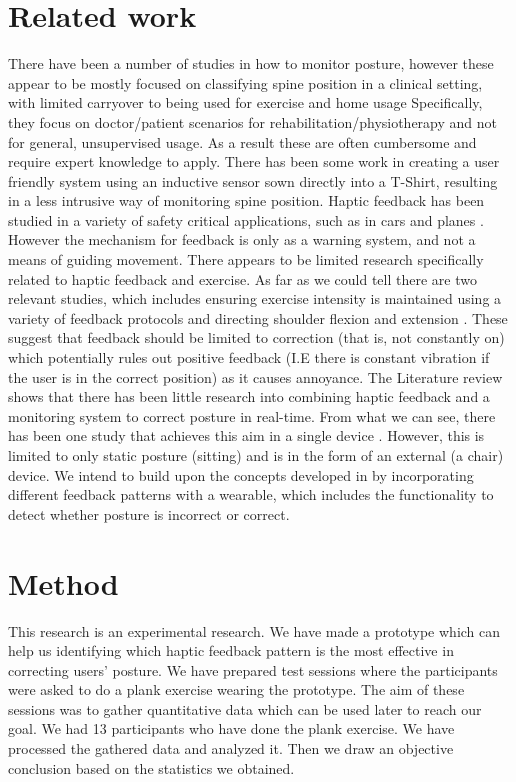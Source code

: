 \documentclass[sigconf]{acmart}
\begin{document}
\section{Related work}
There have been a number of studies in how to monitor posture, however these appear to be mostly focused on classifying spine position in a clinical setting, with limited carryover to being used for exercise and home usage 
\cite{wong2008detecting,voinea2016measurement, wong2008smart} 
Specifically, they focus on doctor/patient scenarios for rehabilitation/physiotherapy and not for general, unsupervised usage. As a result these are often cumbersome and require expert knowledge to apply.  There has been some work in creating a user friendly system \cite{sardini2015wireless} using an inductive sensor sown directly into a T-Shirt, resulting in a less intrusive way of monitoring spine position.  
Haptic feedback has been studied in a variety of safety critical applications, such as in cars and planes 
\cite{goodrich2004learning, hannaford2004proceedings}. However the mechanism for feedback is only as a warning system, and not a means of guiding movement. There appears to be limited research specifically related to haptic feedback and exercise. As far as we could tell there are two relevant studies, which includes ensuring exercise intensity is maintained using a variety of feedback protocols \cite{ferber2007using} and directing shoulder flexion and extension \cite{alizadeh2014haptics}.
These suggest that feedback should be limited to correction (that is, not constantly on) which potentially rules out positive feedback (I.E there is constant vibration if the user is in the correct position) as it causes annoyance. 
The Literature review shows that there has been little research into combining haptic feedback and a monitoring system to correct posture in real-time. From what we can see, there has been one study that achieves this aim in a single device \cite{zheng2010vibrotactile}.  However, this is limited to only static posture (sitting) and is in the form of an external (a chair) device. 
We intend to build upon the concepts developed in \cite{ferber2007using} by incorporating different feedback patterns with a wearable, which includes the functionality to detect whether posture is incorrect or correct. 


\section{Method}
This research is an experimental research. We have made a prototype which can help us identifying which haptic feedback pattern is the most effective in correcting users' posture. We have prepared test sessions where the participants were asked to do a plank exercise wearing the prototype. The aim of these sessions was to gather quantitative data which can be used later to reach our goal.  We had 13 participants who have done the plank exercise. We have processed the gathered data and analyzed it. Then we draw an objective conclusion based on the statistics we obtained. 
\end{document}
